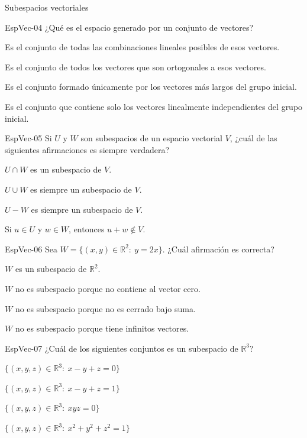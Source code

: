 \documentclass[a4,11pt]{aleph-notas}
\begin{document}
\begin{quiz}{Subespacios vectoriales}
\begin{multi}[]%
    {EspVec-04}
    ¿Qué es el espacio generado por un conjunto de vectores?
    \item* Es el conjunto de todas las combinaciones lineales posibles de esos vectores.
    \item Es el conjunto de todos los vectores que son ortogonales a esos vectores.
    \item Es el conjunto formado únicamente por los vectores más largos del grupo inicial.
    \item Es el conjunto que contiene solo los vectores linealmente independientes del grupo inicial.
\end{multi}

\begin{multi}[]%
    {EspVec-05}
    Si \(U\) y \(W\) son subespacios de un espacio vectorial \(V\), ¿cuál de las siguientes afirmaciones es siempre verdadera?
    \item* \(U \cap W\) es un subespacio de \(V\).
    \item \(U \cup W\) es siempre un subespacio de \(V\).
    \item \(U - W\) es siempre un subespacio de \(V\).
    \item Si \(u \in U\) y \(w \in W\), entonces \(u+w \notin V\).
\end{multi}

\begin{multi}[]%
    {EspVec-06}
    Sea \(W=\{(x,y)\in\mathbb{R}^2:\ y=2x\}\). ¿Cuál afirmación es correcta?
    \item* \(W\) es un subespacio de \(\mathbb{R}^2\).
    \item \(W\) no es subespacio porque no contiene al vector cero.
    \item \(W\) no es subespacio porque no es cerrado bajo suma.
    \item \(W\) no es subespacio porque tiene infinitos vectores.
\end{multi}

\begin{multi}[]%
    {EspVec-07}
    ¿Cuál de los siguientes conjuntos es un subespacio de \(\mathbb{R}^3\)?
    \item* \(\{(x,y,z)\in\mathbb{R}^3:\ x-y+z=0\}\)
    \item \(\{(x,y,z)\in\mathbb{R}^3:\ x-y+z=1\}\)
    \item \(\{(x,y,z)\in\mathbb{R}^3:\ xyz=0\}\)
    \item \(\{(x,y,z)\in\mathbb{R}^3:\ x^2+y^2+z^2=1\}\)
\end{multi}


\end{quiz}
\end{document}
